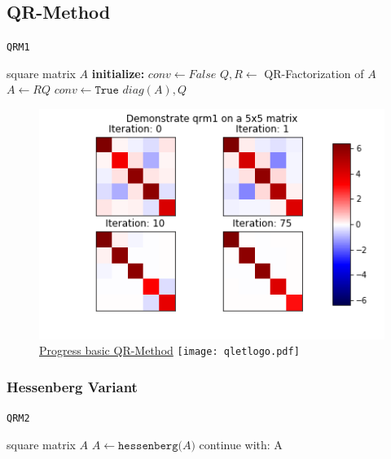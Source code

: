 \documentclass[12pt]{article}
\begin{document}
\subsection{QR-Method}

\begin{algorithm}[H]
\caption{\texttt{QRM1}}
\label{qr1-meth}
  \begin{algorithmic}
    \Require square matrix $A$
    \Statex \textbf{initialize: } $conv \gets False$
      \State $Q, R \gets$ QR-Factorization of $A$
      \State $A \gets RQ$
        \State $conv \gets \texttt{True}$
        \Statex
      \EndIf
    \EndWhile
    \Return $diag\left(A\right), Q$
  \end{algorithmic}
\end{algorithm}

\begin{figure}
\begin{center}
\caption{\href {https://github.com/thsis/NIS18/tree/master/media/plots}{Progress basic QR-Method}  \protect\texttt{[image: qletlogo.pdf]}}
  \includegraphics[scale=0.6]{../media/plots/qrm1.png}
\end{center}
\end{figure}


\subsubsection{Hessenberg Variant}


\begin{algorithm}[H]
\caption{\texttt{QRM2}}
\label{qr2-meth}
\begin{algorithmic}
  \Require square matrix $A$
  \State $A \gets \texttt{hessenberg(}A\texttt{)}$
  \State continue with:  A
\end{algorithmic}
\end{algorithm}
\end{document}
